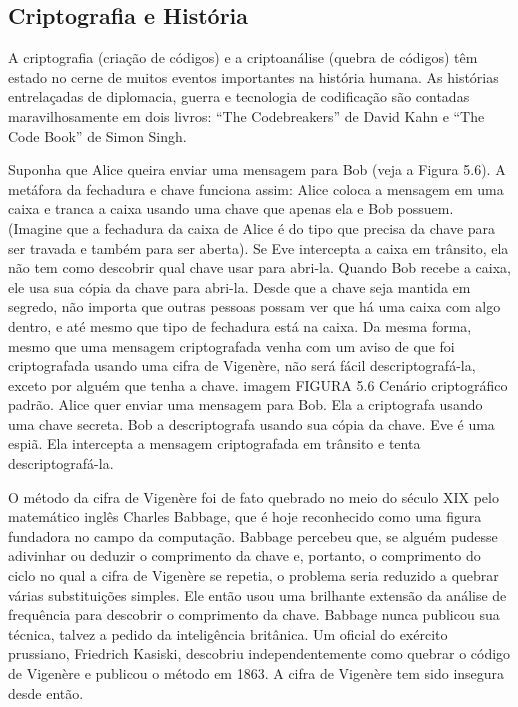 \documentclass{book}
\begin{document}
\subsection{Criptografia e História}
\label{segredos:crip-his}

A criptografia (criação de códigos) e a criptoanálise (quebra de códigos) têm estado no cerne de muitos eventos importantes na história humana. As histórias entrelaçadas de diplomacia, guerra e tecnologia de codificação são contadas maravilhosamente em dois livros: ``The Codebreakers'' de David Kahn e ``The Code Book'' de Simon Singh.

Suponha que Alice queira enviar uma mensagem para Bob (veja a Figura 5.6). A metáfora da fechadura e chave funciona assim: Alice coloca a mensagem em uma caixa e tranca a caixa usando uma chave que apenas ela e Bob possuem. (Imagine que a fechadura da caixa de Alice é do tipo que precisa da chave para ser travada e também para ser aberta). Se Eve intercepta a caixa em trânsito, ela não tem como descobrir qual chave usar para abri-la. Quando Bob recebe a caixa, ele usa sua cópia da chave para abri-la. Desde que a chave seja mantida em segredo, não importa que outras pessoas possam ver que há uma caixa com algo dentro, e até mesmo que tipo de fechadura está na caixa. Da mesma forma, mesmo que uma mensagem criptografada venha com um aviso de que foi criptografada usando uma cifra de Vigenère, não será fácil descriptografá-la, exceto por alguém que tenha a chave.
imagem
FIGURA 5.6 Cenário criptográfico padrão. Alice quer enviar uma mensagem para Bob. Ela a criptografa usando uma chave secreta. Bob a descriptografa usando sua cópia da chave. Eve é uma espiã. Ela intercepta a mensagem criptografada em trânsito e tenta descriptografá-la.

O método da cifra de Vigenère foi de fato quebrado no meio do século XIX pelo matemático inglês Charles Babbage, que é hoje reconhecido como uma figura fundadora no campo da computação. Babbage percebeu que, se alguém pudesse adivinhar ou deduzir o comprimento da chave e, portanto, o comprimento do ciclo no qual a cifra de Vigenère se repetia, o problema seria reduzido a quebrar várias substituições simples. Ele então usou uma brilhante extensão da análise de frequência para descobrir o comprimento da chave. Babbage nunca publicou sua técnica, talvez a pedido da inteligência britânica. Um oficial do exército prussiano, Friedrich Kasiski, descobriu independentemente como quebrar o código de Vigenère e publicou o método em 1863. A cifra de Vigenère tem sido insegura desde então.
\end{document}
